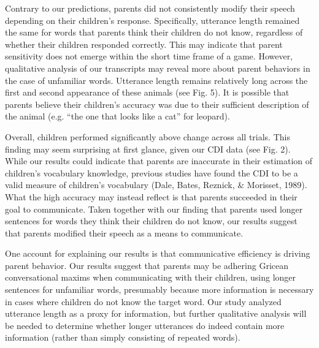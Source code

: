 \documentclass[10pt, letterpaper]{article}
\begin{document}
Contrary to our predictions, parents did not consistently modify their
speech depending on their children's response. Specifically, utterance
length remained the same for words that parents think their children do
not know, regardless of whether their children responded correctly. This
may indicate that parent sensitivity does not emerge within the short
time frame of a game. However, qualitative analysis of our transcripts
may reveal more about parent behaviors in the case of unfamiliar words.
Utterance length remains relatively long across the first and second
appearance of these animals (see Fig. 5). It is possible that parents
believe their children's accuracy was due to their sufficient
description of the animal (e.g. ``the one that looks like a cat'' for
leopard).

Overall, children performed significantly above change across all
trials. This finding may seem surprising at first glance, given our CDI
data (see Fig. 2). While our results could indicate that parents are
inaccurate in their estimation of children's vocabulary knowledge,
previous studies have found the CDI to be a valid measure of children's
vocabulary (Dale, Bates, Reznick, \& Morisset, 1989). What the high
accuracy may instead reflect is that parents succeeded in their goal to
communicate. Taken together with our finding that parents used longer
sentences for words they think their children do not know, our results
suggest that parents modified their speech as a means to communicate.

One account for explaining our results is that communicative efficiency
is driving parent behavior. Our results suggest that parents may be
adhering Gricean conversational maxims when communicating with their
children, using longer sentences for unfamiliar words, presumably
because more information is necessary in cases where children do not
know the target word. Our study analyzed utterance length as a proxy for
information, but further qualitative analysis will be needed to
determine whether longer utterances do indeed contain more information
(rather than simply consisting of repeated words).
\end{document}
